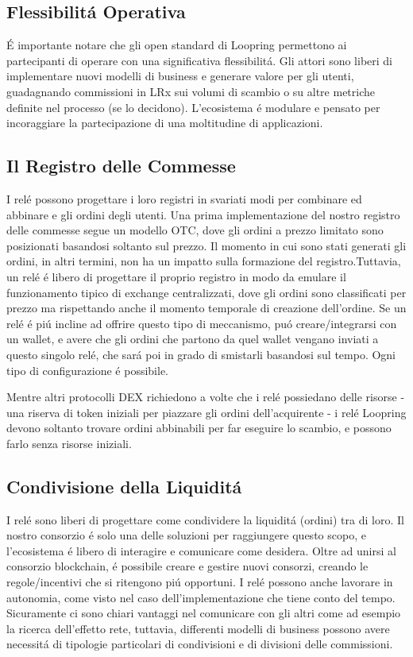 \documentclass[UTF8,nofonts]{article}
\begin{document}
\begin{multicols}{2}
\section{Flessibilit\'a Operativa\label{sec:business_model}}
\'E importante notare che gli open standard di Loopring permettono ai partecipanti di operare con una significativa flessibilit\'a. Gli attori sono liberi di implementare nuovi modelli di business e generare valore per gli utenti, guadagnando commissioni in LRx  sui volumi di scambio o su altre metriche definite nel processo (se lo decidono). L'ecosistema \'e modulare e pensato per incoraggiare la partecipazione di una moltitudine di applicazioni.

\subsection{ Il Registro delle Commesse\label{sec:order_book}}
I rel\'e possono progettare i loro registri in svariati modi per combinare ed abbinare e gli ordini degli utenti. Una prima implementazione del nostro registro delle commesse segue un modello OTC, dove gli ordini a prezzo limitato sono posizionati basandosi soltanto sul prezzo. Il momento in cui sono stati generati gli ordini, in altri termini, non ha un impatto sulla formazione del registro.Tuttavia, un rel\'e \'e libero di progettare il proprio registro in modo da emulare il funzionamento tipico di exchange centralizzati, dove gli ordini sono classificati per prezzo ma rispettando anche il momento temporale di creazione dell'ordine. Se un rel\'e \'e pi\'u incline ad offrire questo tipo di meccanismo, pu\'o creare/integrarsi con un wallet, e avere che gli ordini che partono da quel wallet vengano inviati a questo singolo rel\'e, che sar\'a poi in grado di smistarli basandosi sul tempo. Ogni tipo di  configurazione \'e possibile.

Mentre altri protocolli DEX richiedono a volte che i rel\'e possiedano delle risorse - una riserva di token iniziali per piazzare gli ordini dell'acquirente - i rel\'e Loopring devono soltanto trovare ordini abbinabili per far eseguire lo scambio, e possono farlo senza risorse iniziali.

\subsection{Condivisione della Liquidit\'a\label{sec:liquidity_sharing}}
I rel\'e sono liberi di progettare come condividere la liquidit\'a (ordini) tra di loro. Il nostro consorzio \'e solo una delle soluzioni per raggiungere questo scopo, e l'ecosistema \'e libero di interagire e comunicare come desidera. Oltre ad unirsi al consorzio blockchain, \'e possibile creare e gestire nuovi consorzi, creando le regole/incentivi che si ritengono pi\'u opportuni. I rel\'e possono anche lavorare in autonomia, come visto nel caso dell'implementazione che tiene conto del tempo. Sicuramente ci sono chiari vantaggi nel comunicare con gli altri come ad esempio la ricerca dell'effetto rete, tuttavia, differenti modelli di business possono avere necessit\'a di tipologie particolari di condivisioni e di divisioni delle commissioni.



\end{multicols}
\end{document}
